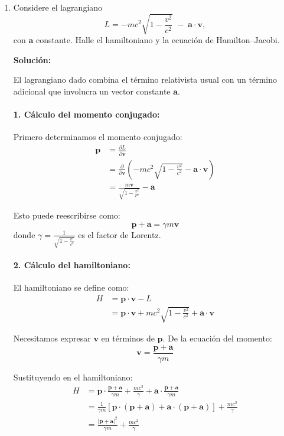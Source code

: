 \documentclass[12pt]{article}
\begin{document}
\begin{enumerate}
  \item Considere el lagrangiano
    \[
      L = -mc^2\sqrt{1-\frac{v^2}{c^2}} \;-\; \mathbf a\cdot\mathbf v,
    \]
    con \(\mathbf a\) constante. Halle el hamiltoniano y la ecuación de Hamilton–Jacobi.

  \textbf{Solución:}

  El lagrangiano dado combina el término relativista usual con un término adicional que involucra un vector constante $\mathbf{a}$.

  \paragraph{1. Cálculo del momento conjugado:}
  Primero determinamos el momento conjugado:
  \begin{align}
  \mathbf{p} &= \frac{\partial L}{\partial \mathbf{v}} \\
  &= \frac{\partial}{\partial \mathbf{v}}\left(-mc^2\sqrt{1-\frac{v^2}{c^2}} - \mathbf{a}\cdot\mathbf{v}\right) \\
  &= \frac{m\mathbf{v}}{\sqrt{1-\frac{v^2}{c^2}}} - \mathbf{a}
  \end{align}

  Esto puede reescribirse como:
  \[
  \mathbf{p} + \mathbf{a} = \gamma m\mathbf{v}
  \]
  donde $\gamma = \frac{1}{\sqrt{1-\frac{v^2}{c^2}}}$ es el factor de Lorentz.

  \paragraph{2. Cálculo del hamiltoniano:}

  El hamiltoniano se define como:
  \begin{align}
  H &= \mathbf{p}\cdot\mathbf{v} - L \\
  &= \mathbf{p}\cdot\mathbf{v} + mc^2\sqrt{1-\frac{v^2}{c^2}} + \mathbf{a}\cdot\mathbf{v}
  \end{align}

  Necesitamos expresar $\mathbf{v}$ en términos de $\mathbf{p}$. De la ecuación del momento:
  \[
  \mathbf{v} = \frac{\mathbf{p} + \mathbf{a}}{\gamma m}
  \]

  Sustituyendo en el hamiltoniano:
  \begin{align}
  H &= \mathbf{p}\cdot\frac{\mathbf{p} + \mathbf{a}}{\gamma m} + \frac{mc^2}{\gamma} + \mathbf{a}\cdot\frac{\mathbf{p} + \mathbf{a}}{\gamma m} \\
  &= \frac{1}{\gamma m}\left[\mathbf{p}\cdot(\mathbf{p} + \mathbf{a}) + \mathbf{a}\cdot(\mathbf{p} + \mathbf{a})\right] + \frac{mc^2}{\gamma} \\
  &= \frac{|\mathbf{p} + \mathbf{a}|^2}{\gamma m} + \frac{mc^2}{\gamma}
  \end{align}


\end{enumerate}
\end{document}
